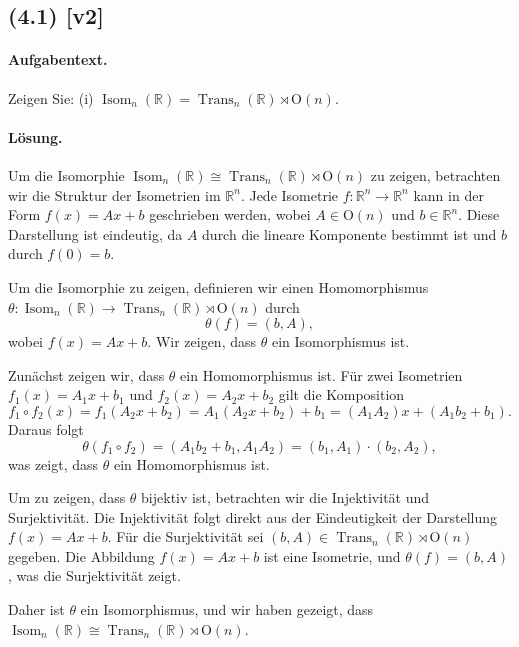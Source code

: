 \documentclass[11pt,a4paper]{article}
\begin{document}
\subsection*{(4.1) [v2]}
\paragraph{Aufgabentext.}
Zeigen Sie:
(i) $\operatorname{Isom}_n(\mathbb{R})=\operatorname{Trans}_n(\mathbb{R}) \rtimes \mathrm{O}(n)$.

\paragraph{Lösung.}
Um die Isomorphie $\operatorname{Isom}_n(\mathbb{R}) \cong \operatorname{Trans}_n(\mathbb{R}) \rtimes \mathrm{O}(n)$ zu zeigen, betrachten wir die Struktur der Isometrien im $\mathbb{R}^n$. Jede Isometrie $f: \mathbb{R}^n \to \mathbb{R}^n$ kann in der Form $f(x) = Ax + b$ geschrieben werden, wobei $A \in \mathrm{O}(n)$ und $b \in \mathbb{R}^n$. Diese Darstellung ist eindeutig, da $A$ durch die lineare Komponente bestimmt ist und $b$ durch $f(0) = b$.

Um die Isomorphie zu zeigen, definieren wir einen Homomorphismus $\theta: \operatorname{Isom}_n(\mathbb{R}) \to \operatorname{Trans}_n(\mathbb{R}) \rtimes \mathrm{O}(n)$ durch
\[
\theta(f) = (b, A),
\]
wobei $f(x) = Ax + b$. Wir zeigen, dass $\theta$ ein Isomorphismus ist.

Zunächst zeigen wir, dass $\theta$ ein Homomorphismus ist. Für zwei Isometrien $f_1(x) = A_1 x + b_1$ und $f_2(x) = A_2 x + b_2$ gilt die Komposition
\[
f_1 \circ f_2(x) = f_1(A_2 x + b_2) = A_1(A_2 x + b_2) + b_1 = (A_1 A_2)x + (A_1 b_2 + b_1).
\]
Daraus folgt
\[
\theta(f_1 \circ f_2) = (A_1 b_2 + b_1, A_1 A_2) = (b_1, A_1) \cdot (b_2, A_2),
\]
was zeigt, dass $\theta$ ein Homomorphismus ist.

Um zu zeigen, dass $\theta$ bijektiv ist, betrachten wir die Injektivität und Surjektivität. Die Injektivität folgt direkt aus der Eindeutigkeit der Darstellung $f(x) = Ax + b$. Für die Surjektivität sei $(b, A) \in \operatorname{Trans}_n(\mathbb{R}) \rtimes \mathrm{O}(n)$ gegeben. Die Abbildung $f(x) = Ax + b$ ist eine Isometrie, und $\theta(f) = (b, A)$, was die Surjektivität zeigt.

Daher ist $\theta$ ein Isomorphismus, und wir haben gezeigt, dass $\operatorname{Isom}_n(\mathbb{R}) \cong \operatorname{Trans}_n(\mathbb{R}) \rtimes \mathrm{O}(n)$.

\end{document}
